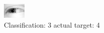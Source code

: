 \begin{figure}[h!]
\begin{center}
\includegraphics[width=0.60\columnwidth]{figures/ID2532_class_3_target_4.png}
\end{center}
\caption{ Classification: 3 actual target: 4}
\label{fig:ID2532_class_3_target_4}
\end{figure}
